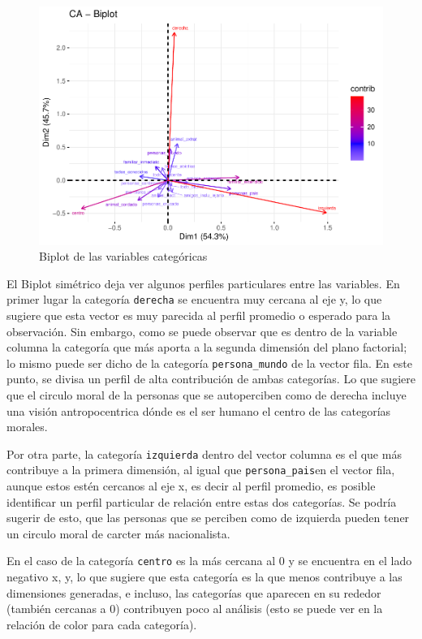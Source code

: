 \documentclass[
]{article}
\begin{document}
\begin{figure}
\centering
\includegraphics{3_analisis_correlacion_files/figure-latex/biplo asimétrico de las categorias-1.pdf}
\caption{Biplot de las variables categóricas}
\end{figure}

El Biplot simétrico deja ver algunos perfiles particulares entre las
variables. En primer lugar la categoría \texttt{derecha} se encuentra
muy cercana al eje y, lo que sugiere que esta vector es muy parecida al
perfil promedio o esperado para la observación. Sin embargo, como se
puede observar que es dentro de la variable columna la categoría que más
aporta a la segunda dimensión del plano factorial; lo mismo puede ser
dicho de la categoría \texttt{persona\_mundo} de la vector fila. En este
punto, se divisa un perfil de alta contribución de ambas categorías. Lo
que sugiere que el circulo moral de la personas que se autoperciben como
de derecha incluye una visión antropocentrica dónde es el ser humano el
centro de las categorías morales.

Por otra parte, la categoría \texttt{izquierda} dentro del vector
columna es el que más contribuye a la primera dimensión, al igual que
\texttt{persona\_pais}en el vector fila, aunque estos estén cercanos al
eje x, es decir al perfil promedio, es posible identificar un perfil
particular de relación entre estas dos categorías. Se podría sugerir de
esto, que las personas que se perciben como de izquierda pueden tener un
circulo moral de carcter más nacionalista.

En el caso de la categoría \texttt{centro} es la más cercana al 0 y se
encuentra en el lado negativo x, y, lo que sugiere que esta categoría es
la que menos contribuye a las dimensiones generadas, e incluso, las
categorías que aparecen en su rededor (también cercanas a 0) contribuyen
poco al análisis (esto se puede ver en la relación de color para cada
categoría).
\end{document}
